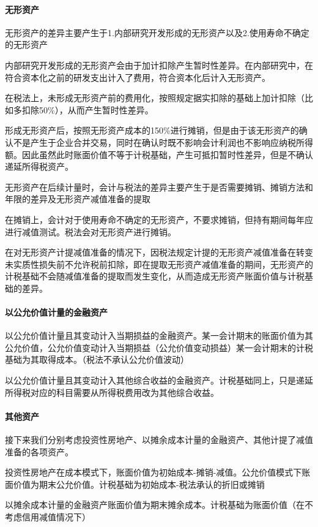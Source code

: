 \documentclass[UTF8,12pt]{ctexart}
\numberwithin{equation}{section} %
\numberwithin{figure}{section}
\numberwithin{table}{section}
\begin{document}
	\paragraph{无形资产}
	无形资产的差异主要产生于1.内部研究开发形成的无形资产以及2.使用寿命不确定的无形资产
	
	内部研究开发形成的无形资产会由于加计扣除产生暂时性差异。在内部研究中，在符合资本化之前的研发支出计入了费用，符合资本化后计入无形资产。
	
	在税法上，未形成无形资产前的费用化，按照规定据实扣除的基础上加计扣除（比如多扣除50\%），从而产生暂时性差异。
	
	形成无形资产后，按照无形资产成本的150\%进行摊销，但是由于该无形资产的确认不是产生于企业合并交易，同时在确认时既不影响会计利润也不影响应纳税所得额。因此虽然此时账面价值不等于计税基础，产生可抵扣暂时性差异，但是不确认递延所得税资产。
	
	无形资产在后续计量时，会计与税法的差异主要产生于是否需要摊销、摊销方法和年限的差异及无形资产减值准备的提取
	
	在摊销上，会计对于使用寿命不确定的无形资产，不要求摊销，但持有期间每年应进行减值测试。税法会对无形资产进行摊销。
	
	在对无形资产计提减值准备的情况下，因税法规定计提的无形资产减值准备在转变未实质性损失前不允许税前扣除，即在提取无形资产减值准备的期间，无形资产的计税基础不会随减值准备的提取而发生变化，从而造成无形资产账面价值与计税基础的差异。
	
	\paragraph{以公允价值计量的金融资产}
	以公允价值计量且其变动计入当期损益的金融资产。某一会计期末的账面价值为其公允价值，公允价值变动计入当期损益（公允价值变动损益）某一会计期末的计税基础为其取得成本。（税法不承认公允价值波动）
	
	以公允价值计量且其变动计入其他综合收益的金融资产。计税基础同上，只是递延所得税对应的科目需要从所得税费用改为其他综合收益。
	
	\paragraph{其他资产}
	接下来我们分别考虑投资性房地产、以摊余成本计量的金融资产、其他计提了减值准备的各项资产。
	
	投资性房地产在成本模式下，账面价值为初始成本-摊销-减值。公允价值模式下账面价值为期末公允价值。计税基础为初始成本-税法承认的折旧或摊销
	
	以摊余成本计量的金融资产账面价值为期末摊余成本。计税基础为账面价值（在不考虑信用减值情况下）
	
\end{document}
